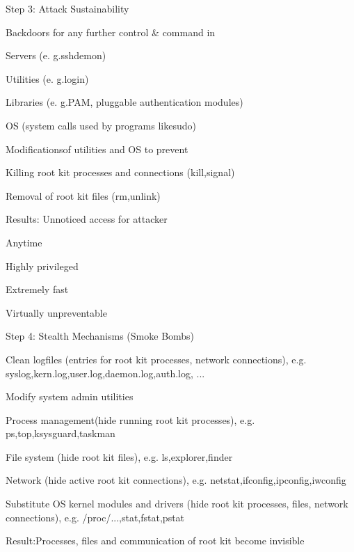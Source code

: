 \documentclass[a4paper]{article}
\begin{document}
\begin{multicols}{3}
    Step 3: Attack Sustainability
    \begin{itemize*}
        \item Backdoors for any further control \& command in
              \begin{itemize*}
                  \item Servers (e. g.sshdemon)
                  \item Utilities (e. g.login)
                  \item Libraries (e. g.PAM, pluggable authentication modules)
                  \item OS (system calls used by programs likesudo)
              \end{itemize*}
        \item Modificationsof utilities and OS to prevent
              \begin{itemize*}
                  \item Killing root kit processes and connections (kill,signal)
                  \item Removal of root kit files (rm,unlink)
              \end{itemize*}
        \item Results: Unnoticed access for attacker
              \begin{itemize*}
                  \item Anytime
                  \item Highly privileged
                  \item Extremely fast
                  \item Virtually unpreventable
              \end{itemize*}
    \end{itemize*}

    Step 4: Stealth Mechanisms (Smoke Bombs)
    \begin{itemize*}
        \item Clean logfiles (entries for root kit processes, network connections), e.g. syslog,kern.log,user.log,daemon.log,auth.log, ...
        \item Modify system admin utilities
              \begin{itemize*}
                  \item Process management(hide running root kit processes), e.g. ps,top,ksysguard,taskman
                  \item File system (hide root kit files), e.g. ls,explorer,finder
                  \item Network (hide active root kit connections), e.g. netstat,ifconfig,ipconfig,iwconfig
              \end{itemize*}
        \item Substitute OS kernel modules and drivers (hide root kit processes, files, network connections), e.g. /proc/...,stat,fstat,pstat
        \item Result:Processes, files and communication of root kit become invisible
    \end{itemize*}


\end{multicols}
\end{document}
